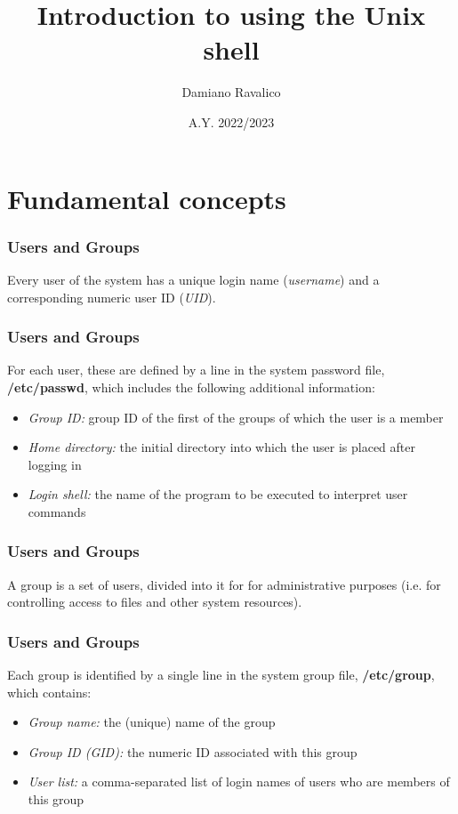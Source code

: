 \documentclass{beamer}
\title{Introduction to using the Unix shell}
\author{Damiano Ravalico}
\institute{University of Trieste}
\date{A.Y. 2022/2023}
\begin{document}
\begin{frame}
\maketitle
\end{frame}

\section{Fundamental concepts}
\begin{frame}
\frametitle{Users and Groups}
\begin{definition}
Every \alert{user} of the system has a unique login name (\emph{username}) and a corresponding numeric user ID (\emph{UID}).
\end{definition}
\end{frame}

\begin{frame}
\frametitle{Users and Groups}
For each user, these are defined by a line in the system password file, \textbf{/etc/passwd}, which includes the following additional information:
\begin{itemize}
\item \emph{Group ID:} group ID of the first of the groups of which the user is a member
\item \emph{Home directory:} the initial directory into which the user is placed after logging in
\item \emph{Login shell:} the name of the program to be executed to interpret user commands
\end{itemize}
\end{frame}

\begin{frame}
\frametitle{Users and Groups}
\begin{definition}
A \alert{group} is a set of users, divided into it for for administrative purposes (i.e. for controlling access to files and other system resources). 
\end{definition}
\end{frame}

\begin{frame}
\frametitle{Users and Groups}
Each group is identified by a single line in the system group file, \textbf{/etc/group}, which contains:
\begin{itemize}
\item \emph{Group name:} the (unique) name of the group
\item \emph{Group ID (GID):} the numeric ID associated with this group
\item \emph{User list:} a comma-separated list of login names of users who are members of this group
\end{itemize}
\end{frame}
\end{document}
